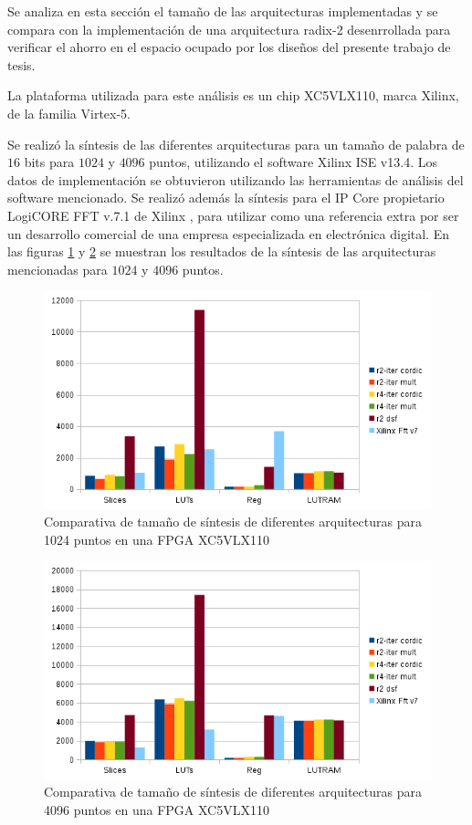 Se analiza en esta sección el tamaño de las arquitecturas implementadas y se compara con la
implementación de una arquitectura radix-2 desenrrollada para verificar el ahorro en el espacio
ocupado por los diseños del presente trabajo de tesis.

La plataforma utilizada para este análisis es un chip XC5VLX110, marca Xilinx, de la
familia Virtex-5. 

Se realizó la síntesis de las diferentes arquitecturas para un tamaño de palabra de $16$ bits para
$1024$ y $4096$ puntos, utilizando el software Xilinx ISE v13.4. Los datos de implementación se
obtuvieron utilizando las herramientas de análisis del software mencionado. Se realizó además la
síntesis para el IP Core propietario LogiCORE FFT v.7.1 de Xilinx \cite{fftXilinx}, para utilizar
como una referencia extra por ser un desarrollo comercial de una empresa especializada en
electrónica digital. En las figuras \ref{fig:sizecomp1024} y \ref{fig:sizecomp4096} se muestran los
resultados de la síntesis de las arquitecturas mencionadas para $1024$ y $4096$ puntos.

\begin{figure}[htb!]
        \centering
        \includegraphics[width=12cm]{./figures/sizecomp1024.png}
        \caption{Comparativa de tamaño de síntesis de diferentes arquitecturas para 1024 puntos en
        una FPGA XC5VLX110}
        \label{fig:sizecomp1024}
\end{figure}

\begin{figure}[htb!]
        \centering
        \includegraphics[width=12cm]{./figures/sizecomp4096.png}
        \caption{Comparativa de tamaño de síntesis de diferentes arquitecturas para 4096 puntos en
        una FPGA XC5VLX110}
        \label{fig:sizecomp4096}
\end{figure}

